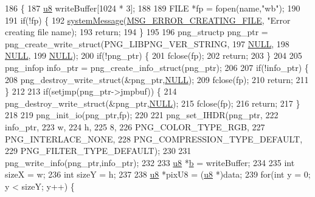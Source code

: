 \begin{DoxyCode}
186 \{
187   \mbox{\hyperlink{_system_8h_aed742c436da53c1080638ce6ef7d13de}{u8}} writeBuffer[1024 * 3];
188   
189   FILE *fp = fopen(name,\textcolor{stringliteral}{"wb"});
190 
191   \textcolor{keywordflow}{if}(!fp) \{
192     \mbox{\hyperlink{system_8cpp_a747a9cb8e015a3d45cca636b5bd0fc69}{systemMessage}}(\mbox{\hyperlink{_n_l_s_8h_a165f1f2539e202f0a24e6e9583c63475}{MSG\_ERROR\_CREATING\_FILE}}, \textcolor{stringliteral}{"Error creating file %
      name);
193     \textcolor{keywordflow}{return};
194   \}
195   
196   png\_structp png\_ptr = png\_create\_write\_struct(PNG\_LIBPNG\_VER\_STRING,
197                                                 \mbox{\hyperlink{getopt1_8c_a070d2ce7b6bb7e5c05602aa8c308d0c4}{NULL}},
198                                                 \mbox{\hyperlink{getopt1_8c_a070d2ce7b6bb7e5c05602aa8c308d0c4}{NULL}},
199                                                 \mbox{\hyperlink{getopt1_8c_a070d2ce7b6bb7e5c05602aa8c308d0c4}{NULL}});
200   \textcolor{keywordflow}{if}(!png\_ptr) \{
201     fclose(fp);
202     \textcolor{keywordflow}{return};
203   \}
204 
205   png\_infop info\_ptr = png\_create\_info\_struct(png\_ptr);
206 
207   \textcolor{keywordflow}{if}(!info\_ptr) \{
208     png\_destroy\_write\_struct(&png\_ptr,\mbox{\hyperlink{getopt1_8c_a070d2ce7b6bb7e5c05602aa8c308d0c4}{NULL}});
209     fclose(fp);
210     \textcolor{keywordflow}{return};
211   \}
212 
213   \textcolor{keywordflow}{if}(setjmp(png\_ptr->jmpbuf)) \{
214     png\_destroy\_write\_struct(&png\_ptr,\mbox{\hyperlink{getopt1_8c_a070d2ce7b6bb7e5c05602aa8c308d0c4}{NULL}});
215     fclose(fp);
216     \textcolor{keywordflow}{return};
217   \}
218 
219   png\_init\_io(png\_ptr,fp);
220 
221   png\_set\_IHDR(png\_ptr,
222                info\_ptr,
223                w,
224                h,
225                8,
226                PNG\_COLOR\_TYPE\_RGB,
227                PNG\_INTERLACE\_NONE,
228                PNG\_COMPRESSION\_TYPE\_DEFAULT,
229                PNG\_FILTER\_TYPE\_DEFAULT);
230 
231   png\_write\_info(png\_ptr,info\_ptr);
232 
233   \mbox{\hyperlink{_system_8h_aed742c436da53c1080638ce6ef7d13de}{u8}} *\mbox{\hyperlink{expr-lex_8cpp_a91b64995742fd30063314f12340b4b5a}{b}} = writeBuffer;
234 
235   \textcolor{keywordtype}{int} sizeX = w;
236   \textcolor{keywordtype}{int} sizeY = h;
237 
238   \mbox{\hyperlink{_system_8h_aed742c436da53c1080638ce6ef7d13de}{u8}} *pixU8 = (\mbox{\hyperlink{_system_8h_aed742c436da53c1080638ce6ef7d13de}{u8}} *)data;
239   \textcolor{keywordflow}{for}(\textcolor{keywordtype}{int} y = 0; y < sizeY; y++) \{
}
\end{DoxyCode}
